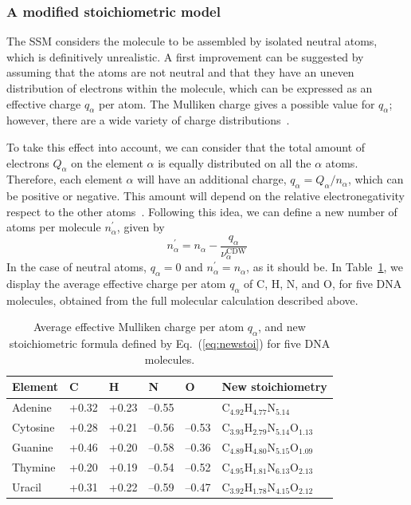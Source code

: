 \documentclass[preprint,showpacs]{revtex4}
\begin{document}
\subsubsection{A modified stoichiometric model}

The SSM considers the molecule to be assembled by isolated neutral atoms, 
which is definitively unrealistic. A first improvement can be suggested 
by assuming that the atoms are not neutral and that they have an uneven
distribution of electrons within the molecule, which can be expressed as 
an effective charge $q_{\alpha}$ per atom. The Mulliken charge gives a 
possible value for $q_{\alpha}$; however, there are a wide variety of 
charge distributions~\cite{lee2003}.

To take this effect into account, we can consider that the total amount 
of electrons $Q_{\alpha }$ on the element
$\alpha$ is equally distributed on all the $\alpha$ atoms. Therefore, 
each element $\alpha$ will have an additional charge, 
$q_{\alpha}=Q_{\alpha}/n_{\alpha}$, which can be positive or negative.
This amount will depend on the relative electronegativity respect to 
the other atoms~\cite{rappe1991}. 
Following this idea, we can define a new number of atoms per molecule
$n_{\alpha }^{\prime }$, given by
\begin{equation}
n_{\alpha }^{\prime }=n_{\alpha }-
\frac{q_{\alpha }}{\nu_{\alpha }^{\text{CDW}}}
\label{eq:newstoi}
\end{equation}%
In the case of neutral atoms, $q_{\alpha}=0$ and 
$n_{\alpha}^{\prime}=n_{\alpha}$, as it should be. 
In Table~\ref{tab:newstoi}, we display the average effective charge 
per atom $q_{\alpha}$ of C, H, N, and O, for five DNA molecules,
obtained from the full molecular calculation described 
above.

\begin{table}[H]
\begin{center}
\begin{tabular}{|p{}|p{}|p{}|p{
}|p{}|p{}|}
\hline
Element & C & H & N & O & New stoichiometry \\
\hline
Adenine & +0.32 & +0.23 & --0.55 &       & 
C$_{4.92}$H$_{4.77}$N$_{5.14}$ \\ 
\hline
Cytosine & +0.28 & +0.21 & --0.56 & --0.53 & 
C$_{3.93}$H$_{2.79}$N$_{5.14}$O$_{1.13}$ \\ 
\hline
Guanine & +0.46 & +0.20 & --0.58 & --0.36 & 
C$_{4.89}$H$_{4.80}$N$_{5.15}$O$_{1.09}$ \\ 
\hline
Thymine & +0.20 & +0.19 & --0.54 & --0.52 & 
C$_{4.95}$H$_{1.81}$N$_{6.13}$O$_{2.13}$ \\ 
\hline
Uracil & +0.31 & +0.22 & --0.59 & --0.47 & 
C$_{3.92}$H$_{1.78}$N$_{4.15}$O$_{2.12}$ \\ 
\hline
\end{tabular}
\caption{Average effective Mulliken charge per atom $q_{\alpha}$, and 
new stoichiometric formula defined by Eq.~(\ref{eq:newstoi}) for five 
DNA molecules.}
\label{tab:newstoi}
\end{center}
\end{table}
\end{document}
